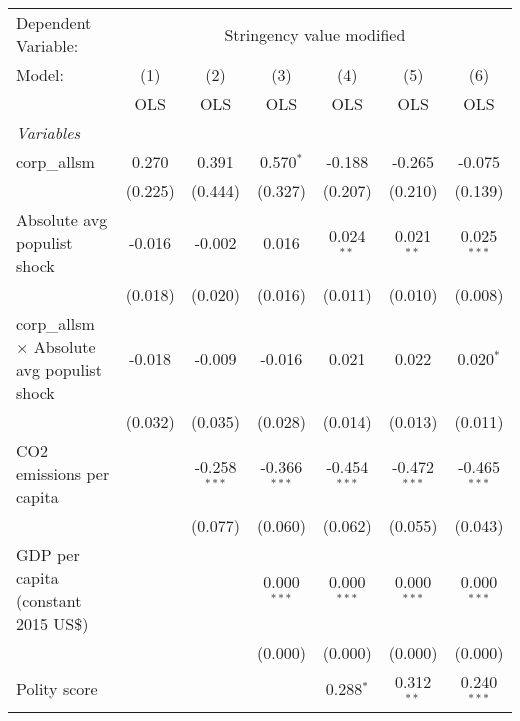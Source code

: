 
\begingroup
\centering
\begin{tabular}{lcccccc}
   \toprule
   Dependent Variable: & \multicolumn{6}{c}{Stringency value modified}\\
   Model:                                             & (1)     & (2)            & (3)            & (4)            & (5)            & (6)\\  
                                                      &  OLS    & OLS            & OLS            & OLS            & OLS            & OLS\\  
   \midrule
   \emph{Variables}\\
   corp\_allsm                                        & 0.270   & 0.391          & 0.570$^{*}$    & -0.188         & -0.265         & -0.075\\   
                                                      & (0.225) & (0.444)        & (0.327)        & (0.207)        & (0.210)        & (0.139)\\   
   Absolute avg populist shock                        & -0.016  & -0.002         & 0.016          & 0.024$^{**}$   & 0.021$^{**}$   & 0.025$^{***}$\\   
                                                      & (0.018) & (0.020)        & (0.016)        & (0.011)        & (0.010)        & (0.008)\\   
   corp\_allsm $\times$ Absolute avg populist shock   & -0.018  & -0.009         & -0.016         & 0.021          & 0.022          & 0.020$^{*}$\\   
                                                      & (0.032) & (0.035)        & (0.028)        & (0.014)        & (0.013)        & (0.011)\\   
   CO2 emissions per capita                           &         & -0.258$^{***}$ & -0.366$^{***}$ & -0.454$^{***}$ & -0.472$^{***}$ & -0.465$^{***}$\\   
                                                      &         & (0.077)        & (0.060)        & (0.062)        & (0.055)        & (0.043)\\   
   GDP per capita (constant 2015 US\$)                &         &                & 0.000$^{***}$  & 0.000$^{***}$  & 0.000$^{***}$  & 0.000$^{***}$\\   
                                                      &         &                & (0.000)        & (0.000)        & (0.000)        & (0.000)\\   
   Polity score                                       &         &                &                & 0.288$^{*}$    & 0.312$^{**}$   & 0.240$^{***}$\\   

\end{tabular}
